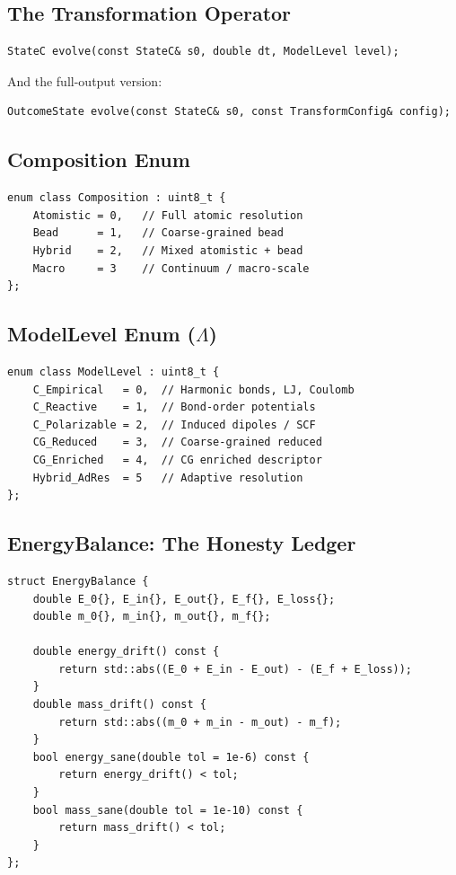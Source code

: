 \documentclass[11pt]{article}
\begin{document}
\subsection{The Transformation Operator}

\begin{lstlisting}[caption={evolve --- The engine becomes a function}]
StateC evolve(const StateC& s0, double dt, ModelLevel level);
\end{lstlisting}

And the full-output version:

\begin{lstlisting}[caption={Full evolve with OutcomeState}]
OutcomeState evolve(const StateC& s0, const TransformConfig& config);
\end{lstlisting}

\subsection{Composition Enum}

\begin{lstlisting}
enum class Composition : uint8_t {
    Atomistic = 0,   // Full atomic resolution
    Bead      = 1,   // Coarse-grained bead
    Hybrid    = 2,   // Mixed atomistic + bead
    Macro     = 3    // Continuum / macro-scale
};
\end{lstlisting}

\subsection{ModelLevel Enum ($\Lambda$)}

\begin{lstlisting}
enum class ModelLevel : uint8_t {
    C_Empirical   = 0,  // Harmonic bonds, LJ, Coulomb
    C_Reactive    = 1,  // Bond-order potentials
    C_Polarizable = 2,  // Induced dipoles / SCF
    CG_Reduced    = 3,  // Coarse-grained reduced
    CG_Enriched   = 4,  // CG enriched descriptor
    Hybrid_AdRes  = 5   // Adaptive resolution
};
\end{lstlisting}

\subsection{EnergyBalance: The Honesty Ledger}

\begin{lstlisting}[caption={EnergyBalance --- mass-energy sanity constraint}]
struct EnergyBalance {
    double E_0{}, E_in{}, E_out{}, E_f{}, E_loss{};
    double m_0{}, m_in{}, m_out{}, m_f{};

    double energy_drift() const {
        return std::abs((E_0 + E_in - E_out) - (E_f + E_loss));
    }
    double mass_drift() const {
        return std::abs((m_0 + m_in - m_out) - m_f);
    }
    bool energy_sane(double tol = 1e-6) const {
        return energy_drift() < tol;
    }
    bool mass_sane(double tol = 1e-10) const {
        return mass_drift() < tol;
    }
};
\end{lstlisting}
\end{document}
